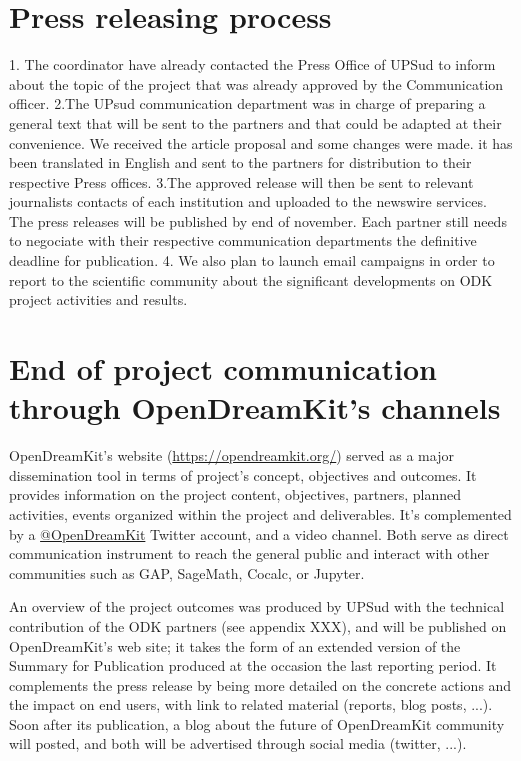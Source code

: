 \documentclass{deliverablereport}
\begin{document}
\section{Press releasing process}

 1. The coordinator have already contacted the Press Office of UPSud to inform about the topic
 of the project that was already approved by the Communication officer. 
 2.The UPsud communication department was in charge of preparing a general text that will be sent
 to the partners and that could be adapted at their convenience. We received the article proposal 
 and some changes were made. it has been translated in English and sent to the partners 
 for distribution to their respective Press offices. 
 3.The approved release will then be sent to relevant journalists contacts of each institution 
 and uploaded to the newswire services. The press releases will be published by end of november. 
 Each partner still needs to negociate with their respective communication departments the 
 definitive deadline for publication.
 4. We also plan to launch email campaigns in order to report to the scientific community
 about the significant developments on ODK project activities and results. 

\section{End of project communication through OpenDreamKit's channels}

OpenDreamKit's website (\url{https://opendreamkit.org/}) served as a
major dissemination tool in terms of project’s concept, objectives and
outcomes. It provides information on the project content, objectives,
partners, planned activities, events organized within the project and
deliverables. It's complemented by a
\href{https://twitter.com/OpenDreamKit}{@OpenDreamKit} Twitter
account, and a video channel. Both serve as direct communication
instrument to reach the general public and interact with other
communities such as GAP, SageMath, Cocalc, or Jupyter.

An overview of the project outcomes was produced by UPSud with the
technical contribution of the ODK partners (see appendix XXX), and
will be published on OpenDreamKit's web site; it takes the form of an
extended version of the Summary for Publication produced at the
occasion the last reporting period. It complements the press release
by being more detailed on the concrete actions and the impact on end
users, with link to related material (reports, blog posts, ...). Soon
after its publication, a blog about the future of OpenDreamKit
community will posted, and both will be advertised through social
media (twitter, ...).
\end{document}
